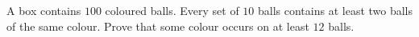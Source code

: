 A box contains $100$ coloured balls. Every set of $10$ balls contains at least two balls of the same colour. Prove that some colour occurs on at least $12$ balls.
